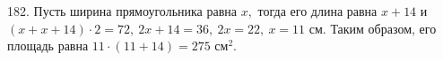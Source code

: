 182. Пусть ширина прямоугольника равна $x,$ тогда его длина равна $x+14$ и $(x+x+14)\cdot2=72,\ 2x+14=36,\ 2x=22,\ x=11$ см. Таким образом, его площадь равна $11\cdot(11+14)=275\text{ см}^2.$\\
